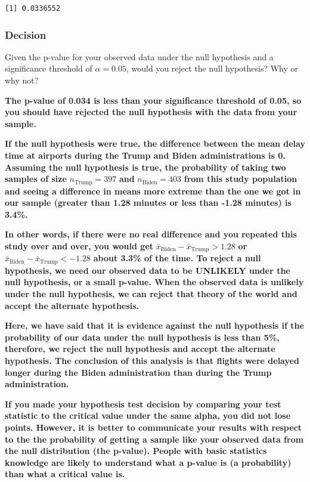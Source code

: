 \documentclass[
  letterpaper,
  DIV=11,
  numbers=noendperiod]{scrartcl}
\begin{document}
\begin{verbatim}
[1] 0.0336552
\end{verbatim}

\subsubsection{Decision}\label{decision-1}

Given the p-value for your observed data under the null hypothesis and a
significance threshold of \(\alpha=0.05\), would you reject the null
hypothesis? Why or why not?

\begin{tcolorbox}[enhanced jigsaw, colback=white, breakable, arc=.35mm, left=2mm, colframe=quarto-callout-warning-color-frame, opacityback=0, rightrule=.15mm, toprule=.15mm, bottomrule=.15mm, leftrule=.75mm]

\textbf{The p-value of 0.034 is less than your significance threshold of
0.05, so you should have rejected the null hypothesis with the data from
your sample.}

\textbf{If the null hypothesis were true, the difference between the
mean delay time at airports during the Trump and Biden administrations
is 0. Assuming the null hypothesis is true, the probability of taking
two samples of size} \(n_{\text{Trump}}=397\) \textbf{and}
\(n_{\text{Biden}}=403\) \textbf{from this study population and seeing a
difference in means more extreme than the one we got in our sample
(greater than 1.28 minutes or less than -1.28 minutes) is 3.4\%.}

\textbf{In other words, if there were no real difference and you
repeated this study over and over, you would get}
\(\bar{x}_{\text{Biden}}-\bar{x}_{\text{Trump}}>1.28\) \textbf{or}
\(\bar{x}_{\text{Biden}}-\bar{x}_{\text{Trump}}<-1.28\) \textbf{about
3.3\% of the time. To reject a null hypothesis, we need our observed
data to be UNLIKELY under the null hypothesis, or a small p-value. When
the observed data is unlikely under the null hypothesis, we can reject
that theory of the world and accept the alternate hypothesis.}

\textbf{Here, we have said that it is evidence against the null
hypothesis if the probability of our data under the null hypothesis is
less than 5\%, therefore, we reject the null hypothesis and accept the
alternate hypothesis. The conclusion of this analysis is that flights
were delayed longer during the Biden administration than during the
Trump administration.}

\textbf{If you made your hypothesis test decision by comparing your test
statistic to the critical value under the same alpha, you did not lose
points. However, it is better to communicate your results with respect
to the the probability of getting a sample like your observed data from
the null distribution (the p-value). People with basic statistics
knowledge are likely to understand what a p-value is (a probability)
than what a critical value is.}

\end{tcolorbox}
\end{document}
